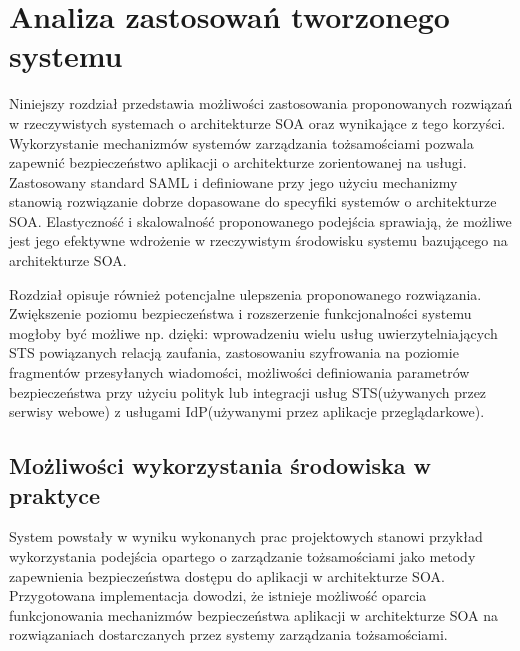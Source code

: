 \chapter{Analiza zastosowań tworzonego systemu}
\label{cha:zastosowania}

{\it

Niniejszy rozdział przedstawia możliwości zastosowania proponowanych rozwiązań w rzeczywistych systemach o architekturze SOA oraz wynikające z tego korzyści. Wykorzystanie mechanizmów systemów zarządzania tożsamościami pozwala zapewnić bezpieczeństwo aplikacji o architekturze zorientowanej na usługi. Zastosowany standard SAML i definiowane przy jego użyciu mechanizmy stanowią rozwiązanie dobrze dopasowane do specyfiki systemów o architekturze SOA. Elastyczność i skalowalność proponowanego podejścia sprawiają, że możliwe jest jego efektywne wdrożenie w rzeczywistym środowisku systemu bazującego na architekturze SOA.

Rozdział opisuje również potencjalne ulepszenia proponowanego rozwiązania. Zwiększenie poziomu bezpieczeństwa i rozszerzenie funkcjonalności systemu mogłoby być możliwe np. dzięki: wprowadzeniu wielu usług uwierzytelniających STS powiązanych relacją zaufania, zastosowaniu szyfrowania na poziomie fragmentów przesyłanych wiadomości, możliwości definiowania parametrów bezpieczeństwa przy użyciu polityk lub integracji usług STS(używanych przez serwisy webowe) z usługami IdP(używanymi przez aplikacje przeglądarkowe).

}


\section{Możliwości wykorzystania środowiska w praktyce}
\label{sec:wykorzystanieWPraktyce}

	System powstały w wyniku wykonanych prac projektowych stanowi przykład wykorzystania podejścia opartego o zarządzanie tożsamościami jako metody zapewnienia bezpieczeństwa dostępu do aplikacji w architekturze SOA. Przygotowana implementacja dowodzi, że  istnieje możliwość oparcia funkcjonowania mechanizmów bezpieczeństwa aplikacji w architekturze SOA na rozwiązaniach dostarczanych przez systemy zarządzania tożsamościami. 

